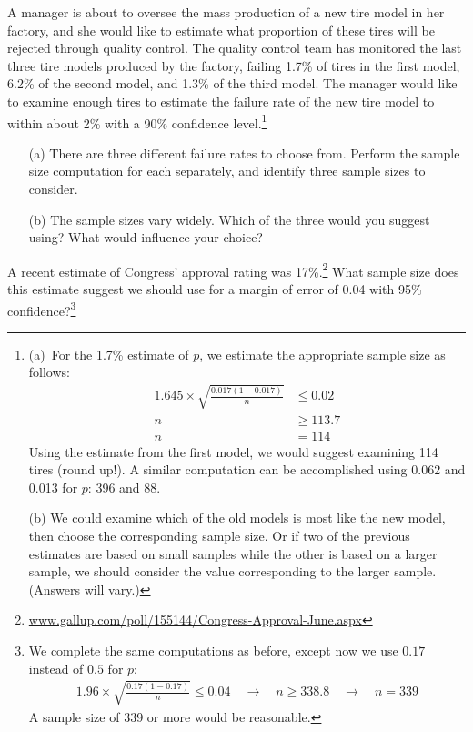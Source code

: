 \begin{exercise}
A manager is about to oversee the mass production of a new tire model in her factory, and she would like to estimate what proportion of these tires will be rejected through quality control. The quality control team has monitored the last three tire models produced by the factory, failing 1.7\% of tires in the first model, 6.2\% of the second model, and 1.3\% of the third model. The manager would like to examine enough tires to estimate the failure rate of the new tire model to within about 2\% with a 90\% confidence level.\footnote{(a)~For the 1.7\% estimate of $p$, we estimate the appropriate sample size as follows:
\begin{align*}
1.645\times \sqrt{\frac{0.017(1-0.017)}{n}} &\leq 0.02 \\
n &\geq 113.7 \\
n&=114
\end{align*}
Using the estimate from the first model, we would suggest examining 114 tires (round up!). A similar computation can be accomplished using 0.062 and 0.013 for $p$: 396 and 88. \par
(b) We could examine which of the old models is most like the new model, then choose the corresponding sample size. Or if two of the previous estimates are based on small samples while the other is based on a larger sample, we should consider the value corresponding to the larger sample. (Answers will vary.)}
\begin{itemize}
\setlength{\itemsep}{0mm}
\item[(a)] There are three different failure rates to choose from. Perform the sample size computation for each separately, and identify three sample sizes to consider.
\item[(b)] The sample sizes vary widely. Which of the three would you suggest using? What would influence your choice?
\end{itemize}
\end{exercise}


\begin{exercise}
A recent estimate of Congress' approval rating was 17\%.\footnote{\href{http://www.gallup.com/poll/155144/Congress-Approval-June.aspx}{www.gallup.com/poll/155144/Congress-Approval-June.aspx}} What sample size does this estimate suggest we should use for a margin of error of 0.04 with 95\% confidence?\footnote{We complete the same computations as before, except now we use $0.17$ instead of $0.5$ for $p$:
\begin{align*}
1.96\times \sqrt{\frac{0.17(1-0.17)}{n}} \leq 0.04
\quad\rightarrow\quad
n \geq 338.8
\quad\rightarrow\quad
n = 339
\end{align*}
A sample size of 339 or more would be reasonable.}


\end{exercise}


